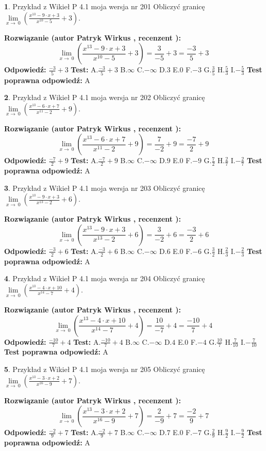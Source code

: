 \documentclass[12pt, a4paper]{article}
\theoremstyle{definition} %
\newtheorem{zad}{}
\newcommand{\zadStart}[1]{\begin{zad}#1\newline}
\newcommand{\zadStop}{\end{zad}}
\newcommand{\rozwStart}[2]{\noindent \textbf{Rozwiązanie (autor #1 , recenzent #2): }\newline}
\newcommand{\rozwStop}{\newline}
\newcommand{\odpStart}{\noindent \textbf{Odpowiedź:}\newline}
\newcommand{\odpStop}{\newline}
\newcommand{\testStart}{\noindent \textbf{Test:}\newline}
\newcommand{\testStop}{\newline}
\newcommand{\kluczStart}{\noindent \textbf{Test poprawna odpowiedź:}\newline}
\newcommand{\kluczStop}{\newline}
\begin{document}
\zadStart{Przykład z Wikieł P 4.1 moja wersja nr 201}
Obliczyć granicę $\lim\limits_{x\to\ 0}(\frac{x^{13}-9 \cdot x +3}{x^{10}-5}+3)$.
\zadStop
\rozwStart{Patryk Wirkus}{}
$$\lim\limits_{x\to\ 0}(\frac{x^{13}-9 \cdot x +3}{x^{10}-5}+3)=\frac{3}{-5}+3=\frac{-3}{5}+3$$
\rozwStop
\odpStart
$\frac{-3}{5}+3$
\odpStop
\testStart
A.$\frac{-3}{5}+3$
B.$\infty$
C.$-\infty$
D.$3$
E.$0$
F.$-3$
G.$\frac{3}{5}$
H.$\frac{5}{3}$
I.$-\frac{5}{3}$
\testStop
\kluczStart
A
\kluczStop



\zadStart{Przykład z Wikieł P 4.1 moja wersja nr 202}
Obliczyć granicę $\lim\limits_{x\to\ 0}(\frac{x^{13}-6 \cdot x +7}{x^{11}-2}+9)$.
\zadStop
\rozwStart{Patryk Wirkus}{}
$$\lim\limits_{x\to\ 0}(\frac{x^{13}-6 \cdot x +7}{x^{11}-2}+9)=\frac{7}{-2}+9=\frac{-7}{2}+9$$
\rozwStop
\odpStart
$\frac{-7}{2}+9$
\odpStop
\testStart
A.$\frac{-7}{2}+9$
B.$\infty$
C.$-\infty$
D.$9$
E.$0$
F.$-9$
G.$\frac{7}{2}$
H.$\frac{2}{7}$
I.$-\frac{2}{7}$
\testStop
\kluczStart
A
\kluczStop



\zadStart{Przykład z Wikieł P 4.1 moja wersja nr 203}
Obliczyć granicę $\lim\limits_{x\to\ 0}(\frac{x^{13}-9 \cdot x +3}{x^{13}-2}+6)$.
\zadStop
\rozwStart{Patryk Wirkus}{}
$$\lim\limits_{x\to\ 0}(\frac{x^{13}-9 \cdot x +3}{x^{13}-2}+6)=\frac{3}{-2}+6=\frac{-3}{2}+6$$
\rozwStop
\odpStart
$\frac{-3}{2}+6$
\odpStop
\testStart
A.$\frac{-3}{2}+6$
B.$\infty$
C.$-\infty$
D.$6$
E.$0$
F.$-6$
G.$\frac{3}{2}$
H.$\frac{2}{3}$
I.$-\frac{2}{3}$
\testStop
\kluczStart
A
\kluczStop



\zadStart{Przykład z Wikieł P 4.1 moja wersja nr 204}
Obliczyć granicę $\lim\limits_{x\to\ 0}(\frac{x^{13}-4 \cdot x +10}{x^{14}-7}+4)$.
\zadStop
\rozwStart{Patryk Wirkus}{}
$$\lim\limits_{x\to\ 0}(\frac{x^{13}-4 \cdot x +10}{x^{14}-7}+4)=\frac{10}{-7}+4=\frac{-10}{7}+4$$
\rozwStop
\odpStart
$\frac{-10}{7}+4$
\odpStop
\testStart
A.$\frac{-10}{7}+4$
B.$\infty$
C.$-\infty$
D.$4$
E.$0$
F.$-4$
G.$\frac{10}{7}$
H.$\frac{7}{10}$
I.$-\frac{7}{10}$
\testStop
\kluczStart
A
\kluczStop



\zadStart{Przykład z Wikieł P 4.1 moja wersja nr 205}
Obliczyć granicę $\lim\limits_{x\to\ 0}(\frac{x^{13}-3 \cdot x +2}{x^{16}-9}+7)$.
\zadStop
\rozwStart{Patryk Wirkus}{}
$$\lim\limits_{x\to\ 0}(\frac{x^{13}-3 \cdot x +2}{x^{16}-9}+7)=\frac{2}{-9}+7=\frac{-2}{9}+7$$
\rozwStop
\odpStart
$\frac{-2}{9}+7$
\odpStop
\testStart
A.$\frac{-2}{9}+7$
B.$\infty$
C.$-\infty$
D.$7$
E.$0$
F.$-7$
G.$\frac{2}{9}$
H.$\frac{9}{2}$
I.$-\frac{9}{2}$
\testStop
\kluczStart
A
\kluczStop
\end{document}
